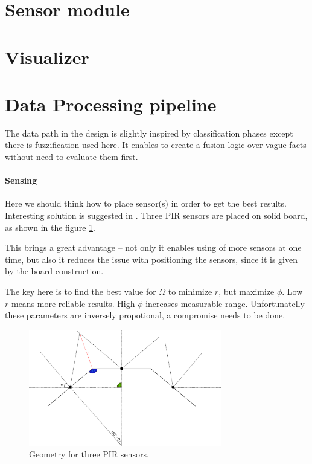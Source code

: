 \section{Sensor module}

\section{Visualizer}

\section{Data Processing pipeline}

The data path in the design is slightly inspired by classification phases except
there is fuzzification used here. It enables to create a fusion logic over vague
facts without need to evaluate them first.

\paragraph{Sensing}
Here we should think how to place sensor(s) in order to get the best results.
Interesting solution is suggested in \cite{GestureControl}. Three PIR sensors are
placed on solid board, as shown in the figure \ref{fig:3pir_geometry}.

This brings a great advantage -- not only it enables using of more sensors at one time, but
also it reduces the issue with positioning the sensors, since it is given by the
board construction.

The key here is to find the best value for $\Omega$ to minimize $r$, but maximize
$\phi$. Low $r$ means more reliable results. High $\phi$ increases measurable range.
Unfortunatelly these parameters are inversely propotional, a compromise needs to be done.

\begin{figure}[h!]
\begin{center}
\includegraphics[width=0.75\textwidth]{obrazky-figures/3pir_geometry.png}
\caption{Geometry for three PIR sensors.\label{fig:3pir_geometry}}
\end{center}
\end{figure}

